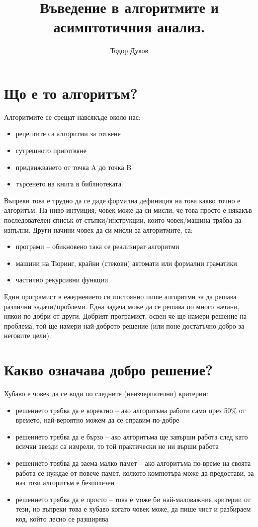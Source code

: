\documentclass{article}
\title{Въведение в алгоритмите и асимптотичния анализ.}
\author{Тодор Дуков}
\date{}
\theoremstyle{definition}
\theoremstyle{plain}
\theoremstyle{remark}
\theoremstyle{definition}
\begin{document}
\maketitle

\section*{Що е то алгоритъм?}

Алгоритмите се срещат навсякъде около нас:
\begin{itemize}
  \item рецептите са алгоритми за готвене
  \item сутрешното приготвяне
  \item придвижването от точка A до точка B
  \item търсенето на книга в библиотеката
\end{itemize}

Въпреки това е трудно да се даде формална дефиниция на това какво точно е алгоритъм.
На ниво интуиция, човек може да си мисли, че това просто е някакъв последователен списък от стъпки/инструкции, които човек/машина трябва да изпълни.
Други начини човек да си мисли за алгоритмите, са:
\begin{itemize}
  \item програми -- обикновено така се реализират алгоритми
  \item машини на Тюринг, крайни (стекови) автомати или формални граматики
  \item частично рекурсивни функции
\end{itemize}

Един програмист в ежедневието си постоянно пише алгоритми за да решава различни задачи/проблеми.
Една задача може да се решава по много начини, някои по-добри от други.
Добрият програмист, освен че ще намери решение на проблема, той ще намери най-доброто решение (или поне достатъчно добро за неговите цели).

\section*{Какво означава добро решение?}

Хубаво е човек да се води по следните (неизчерпателни) критерии:
\begin{itemize}
  \item решението трябва да е коректно -- ако алгоритъма работи само през 50\% от времето, най-вероятно можем да се справим по-добре
  \item решението трябва да е бързо -- ако алгоритъма ще завърши работа след като всички звезди са измрели, то той практически не ни върши работа
  \item решението трябва да заема малко памет -- ако алгоритъма по-време на своята работа се нуждае от повече памет, колкото компютъра може да предостави, за наз този алгоритъм е безполезен
  \item решението трябва да е просто -- това е може би най-маловажния критерии от тези, но въпреки това е хубаво когато човек може, да пише чист и разбираем код, който лесно се разширява
\end{itemize}
\end{document}
